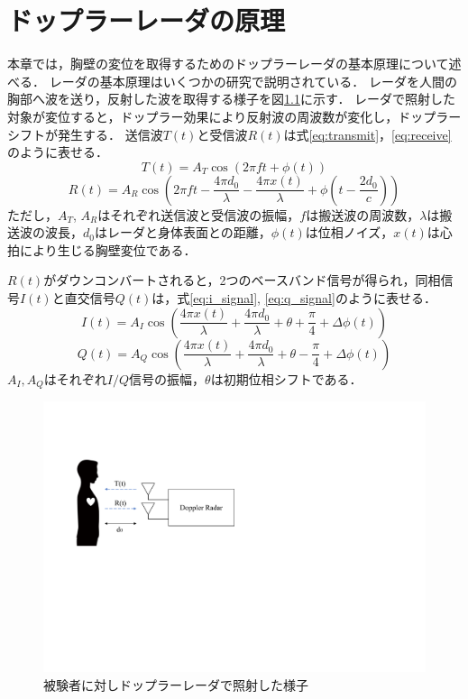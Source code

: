 \chapter{ドップラーレーダの原理}
本章では，胸壁の変位を取得するためのドップラーレーダの基本原理について述べる．
レーダの基本原理はいくつかの研究で説明されている．
レーダを人間の胸部へ波を送り，反射した波を取得する様子を図\ref{fig:radar}に示す．
レーダで照射した対象が変位すると，ドップラー効果により反射波の周波数が変化し，ドップラーシフトが発生する．
送信波$T(t)$と受信波$R(t)$は式\ref{eq:transmit}，\ref{eq:receive}のように表せる．
\begin{equation}\label{eq:transmit}
  T(t) = A_{T} \cos (2\pi ft + \phi (t))
\end{equation}
\begin{equation}\label{eq:receive}
  R(t) = A_{R} \cos (2\pi ft - \frac{4\pi d_0}{\lambda} - \frac{4\pi x(t)}{\lambda} + \phi (t-\frac{2d_0}{c}))
\end{equation}
ただし，$A_T$, $A_R$はそれぞれ送信波と受信波の振幅，$f$は搬送波の周波数，$\lambda$は搬送波の波長，$d_0$はレーダと身体表面との距離，$\phi (t)$は位相ノイズ，$x(t)$は心拍により生じる胸壁変位である．

$R(t)$がダウンコンバートされると，2つのベースバンド信号が得られ，同相信号$I(t)$と直交信号$Q(t)$は，式\ref{eq:i_signal}, \ref{eq:q_signal}のように表せる．
\begin{equation}\label{eq:i_signal}
  I(t) = A_{I} \cos (\frac{4\pi x(t)}{\lambda} + \frac{4\pi d_0}{\lambda} + \theta + \frac{\pi}{4} + \Delta \phi (t))
\end{equation}
\begin{equation}\label{eq:q_signal}
  Q(t) = A_Q \cos (\frac{4\pi x(t)}{\lambda} + \frac{4\pi d_0}{\lambda} + \theta - \frac{\pi}{4} + \Delta \phi (t))
\end{equation}
$A_I, A_Q$はそれぞれ$I/Q$信号の振幅，$\theta$は初期位相シフトである．

\begin{figure}[H]
\begin{center}
\includegraphics[width=\linewidth]{./fig/radar_figure_trim.pdf}
\end{center}
\caption{被験者に対しドップラーレーダで照射した様子}
\label{fig:radar}
\end{figure}

